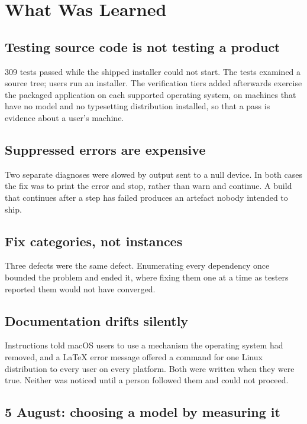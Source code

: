 \documentclass[11pt,a4paper]{article}
\begin{document}
\section{What Was Learned}

\subsection{Testing source code is not testing a product}

309 tests passed while the shipped installer could not start. The tests examined
a source tree; users run an installer. The verification tiers added afterwards
exercise the packaged application on each supported operating system, on
machines that have no model and no typesetting distribution installed, so that a
pass is evidence about a user's machine.

\subsection{Suppressed errors are expensive}

Two separate diagnoses were slowed by output sent to a null device. In both
cases the fix was to print the error and stop, rather than warn and continue.
A build that continues after a step has failed produces an artefact nobody
intended to ship.

\subsection{Fix categories, not instances}

Three defects were the same defect. Enumerating every dependency once bounded
the problem and ended it, where fixing them one at a time as testers reported
them would not have converged.

\subsection{Documentation drifts silently}

Instructions told macOS users to use a mechanism the operating system had
removed, and a LaTeX error message offered a command for one Linux distribution
to every user on every platform. Both were written when they were true. Neither
was noticed until a person followed them and could not proceed.


\subsection{5 August: choosing a model by measuring it}
\end{document}
